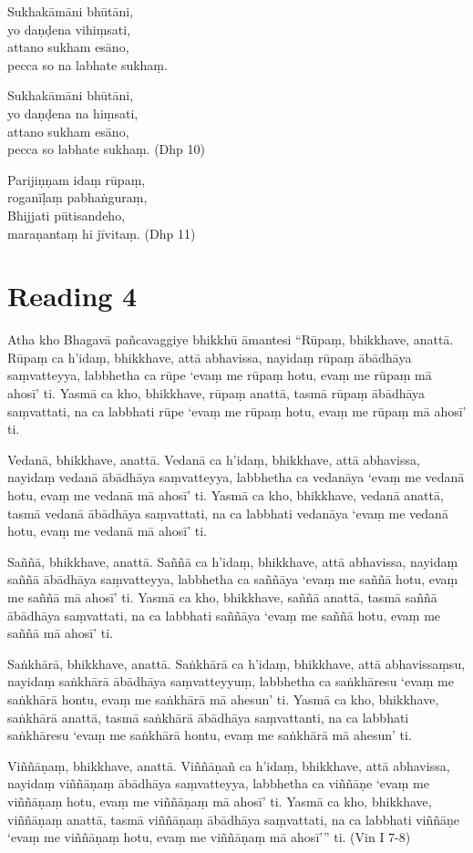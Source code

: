 Sukhakāmāni bhūtāni,\\
yo daṇḍena vihiṃsati,\\
attano sukham esāno,\\
pecca so na labhate sukhaṃ.

Sukhakāmāni bhūtāni,\\
yo daṇḍena na hiṃsati,\\
attano sukham esāno,\\
pecca so labhate sukhaṃ. \hfill(Dhp 10)

Parijiṇṇam idaṃ rūpaṃ,\\
roganīḷaṃ pabhaṅguraṃ,\\
Bhijjati pūtisandeho,\\
maraṇantaṃ hi jīvitaṃ. \hfill(Dhp 11)

\section*{Reading 4}

Atha kho Bhagavā pañcavaggiye bhikkhū āmantesi “Rūpaṃ, bhikkhave, anattā. Rūpaṃ ca h’idaṃ, bhikkhave, attā abhavissa, nayidaṃ rūpaṃ ābādhāya saṃvatteyya, labbhetha ca rūpe ‘evaṃ me rūpaṃ hotu, evaṃ me rūpaṃ mā ahosī’ ti. Yasmā ca kho, bhikkhave, rūpaṃ anattā, tasmā rūpaṃ ābādhāya saṃvattati, na ca labbhati rūpe ‘evaṃ me rūpaṃ hotu, evaṃ me rūpaṃ mā ahosī’ ti.

Vedanā, bhikkhave, anattā. Vedanā ca h’idaṃ, bhikkhave, attā abhavissa, nayidaṃ vedanā ābādhāya saṃvatteyya, labbhetha ca vedanāya ‘evaṃ me vedanā hotu, evaṃ me vedanā mā ahosī’ ti. Yasmā ca kho, bhikkhave, vedanā anattā, tasmā vedanā ābādhāya saṃvattati, na ca labbhati vedanāya ‘evaṃ me vedanā hotu, evaṃ me vedanā mā ahosī’ ti.

Saññā, bhikkhave, anattā. Saññā ca h’idaṃ, bhikkhave, attā abhavissa, nayidaṃ saññā ābādhāya saṃvatteyya, labbhetha ca saññāya ‘evaṃ me saññā hotu, evaṃ me saññā mā ahosī’ ti. Yasmā ca kho, bhikkhave, saññā anattā, tasmā saññā ābādhāya saṃvattati, na ca labbhati saññāya ‘evaṃ me saññā hotu, evaṃ me saññā mā ahosī’ ti.

Saṅkhārā, bhikkhave, anattā. Saṅkhārā ca h’idaṃ, bhikkhave, attā abhavissaṃsu, nayidaṃ saṅkhārā ābādhāya saṃvatteyyuṃ, labbhetha ca saṅkhāresu ‘evaṃ me saṅkhārā hontu, evaṃ me saṅkhārā mā ahesun’ ti. Yasmā ca kho, bhikkhave, saṅkhārā anattā, tasmā saṅkhārā ābādhāya saṃvattanti, na ca labbhati saṅkhāresu ‘evaṃ me saṅkhārā hontu, evaṃ me saṅkhārā mā ahesun’ ti.

Viññāṇaṃ, bhikkhave, anattā. Viññāṇañ ca h’idaṃ, bhikkhave, attā abhavissa, nayidaṃ viññāṇaṃ ābādhāya saṃvatteyya, labbhetha ca viññāṇe ‘evaṃ me viññāṇaṃ hotu, evaṃ me viññāṇaṃ mā ahosī’ ti. Yasmā ca kho, bhikkhave, viññāṇaṃ anattā, tasmā viññāṇaṃ ābādhāya saṃvattati, na ca labbhati viññāṇe ‘evaṃ me viññāṇaṃ hotu, evaṃ me viññāṇaṃ mā ahosī’” ti. \hfill(Vin I 7-8)

